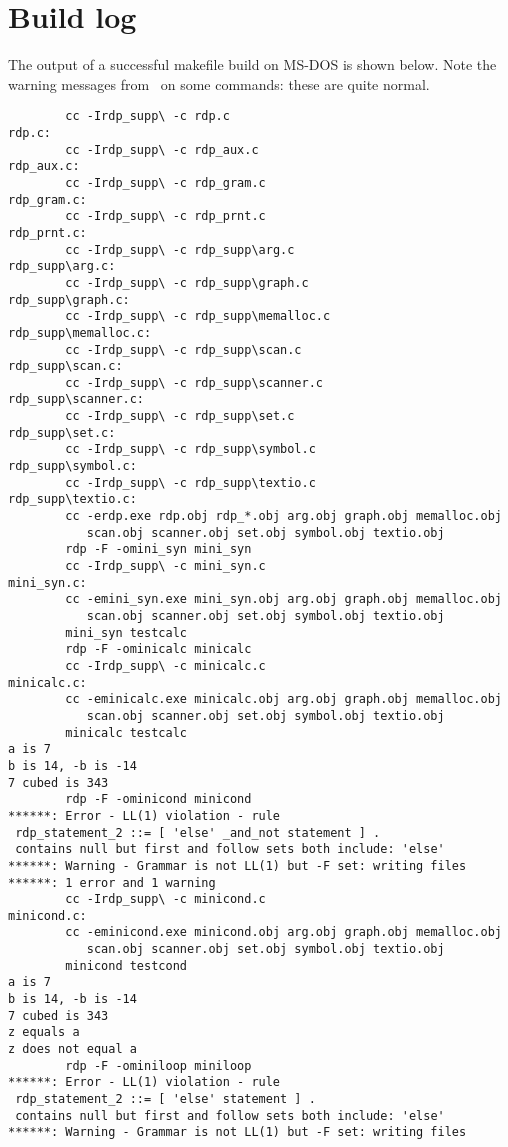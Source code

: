 \section{Build log}

The output of a successful makefile build on MS-DOS is shown below. Note the
warning messages from \rdp\ on some commands: these are quite normal.

{\small
\begin{verbatim}
        cc -Irdp_supp\ -c rdp.c
rdp.c:
        cc -Irdp_supp\ -c rdp_aux.c
rdp_aux.c:
        cc -Irdp_supp\ -c rdp_gram.c
rdp_gram.c:
        cc -Irdp_supp\ -c rdp_prnt.c
rdp_prnt.c:
        cc -Irdp_supp\ -c rdp_supp\arg.c
rdp_supp\arg.c:
        cc -Irdp_supp\ -c rdp_supp\graph.c
rdp_supp\graph.c:
        cc -Irdp_supp\ -c rdp_supp\memalloc.c
rdp_supp\memalloc.c:
        cc -Irdp_supp\ -c rdp_supp\scan.c
rdp_supp\scan.c:
        cc -Irdp_supp\ -c rdp_supp\scanner.c
rdp_supp\scanner.c:
        cc -Irdp_supp\ -c rdp_supp\set.c
rdp_supp\set.c:
        cc -Irdp_supp\ -c rdp_supp\symbol.c
rdp_supp\symbol.c:
        cc -Irdp_supp\ -c rdp_supp\textio.c
rdp_supp\textio.c:
        cc -erdp.exe rdp.obj rdp_*.obj arg.obj graph.obj memalloc.obj 
           scan.obj scanner.obj set.obj symbol.obj textio.obj
        rdp -F -omini_syn mini_syn
        cc -Irdp_supp\ -c mini_syn.c
mini_syn.c:
        cc -emini_syn.exe mini_syn.obj arg.obj graph.obj memalloc.obj 
           scan.obj scanner.obj set.obj symbol.obj textio.obj
        mini_syn testcalc
        rdp -F -ominicalc minicalc
        cc -Irdp_supp\ -c minicalc.c
minicalc.c:
        cc -eminicalc.exe minicalc.obj arg.obj graph.obj memalloc.obj 
           scan.obj scanner.obj set.obj symbol.obj textio.obj 
        minicalc testcalc
a is 7
b is 14, -b is -14
7 cubed is 343
        rdp -F -ominicond minicond
******: Error - LL(1) violation - rule
 rdp_statement_2 ::= [ 'else' _and_not statement ] .
 contains null but first and follow sets both include: 'else'
******: Warning - Grammar is not LL(1) but -F set: writing files
******: 1 error and 1 warning
        cc -Irdp_supp\ -c minicond.c
minicond.c:
        cc -eminicond.exe minicond.obj arg.obj graph.obj memalloc.obj 
           scan.obj scanner.obj set.obj symbol.obj textio.obj 
        minicond testcond
a is 7
b is 14, -b is -14
7 cubed is 343
z equals a
z does not equal a
        rdp -F -ominiloop miniloop
******: Error - LL(1) violation - rule
 rdp_statement_2 ::= [ 'else' statement ] .
 contains null but first and follow sets both include: 'else'
******: Warning - Grammar is not LL(1) but -F set: writing files

\end{verbatim}}

